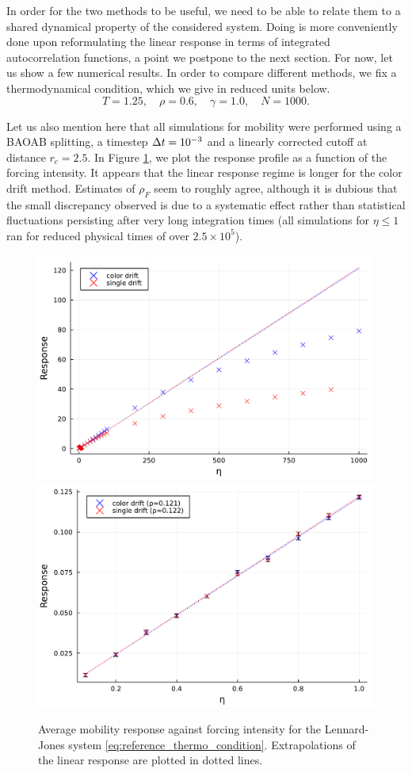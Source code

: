 In order for the two methods to be useful, we need to be able to relate them to a shared dynamical property of the considered system.
Doing is more conveniently done upon reformulating the linear response in terms of integrated autocorrelation functions, a point we postpone to the next section.
For now, let us show a few numerical results.
In order to compare different methods, we fix a thermodynamical condition, which we give in reduced units below.
\begin{equation}
    \label{eq:reference_thermo_condition}
    T=1.25,\quad \rho=0.6,\quad \gamma=1.0,\quad N=1000.
\end{equation}

Let us also mention here that all simulations for mobility were performed using a BAOAB splitting, a timestep ${\Delta t}=10^{-3}$ and a linearly corrected cutoff at distance $r_c=2.5$.
In Figure \ref{fig:nemd_mobility_full}, we plot the response profile as a function of the forcing intensity. 
It appears that the linear response regime is longer for the color drift method.
Estimates of $\rho_F$ seem to roughly agree, although it is dubious that the small discrepancy observed is due to a systematic effect rather than statistical fluctuations persisting after very long integration times (all simulations for $\eta\leq 1$ ran for reduced physical times of over $2.5 \times 10^5$).
\begin{figure}[htbp]
    \begin{center}
      \includegraphics[width=0.7\linewidth]{figures/nemd/nemd_mobility_full.pdf}
      \includegraphics[width=0.7\linewidth]{figures/nemd/nemd_mobility_linear.pdf}
      \caption{ \label{fig:nemd_mobility_full}
        Average mobility response against forcing intensity for the Lennard-Jones system \eqref{eq:reference_thermo_condition}. Extrapolations of the linear response are plotted in dotted lines.
      }
    \end{center}
  \end{figure}
